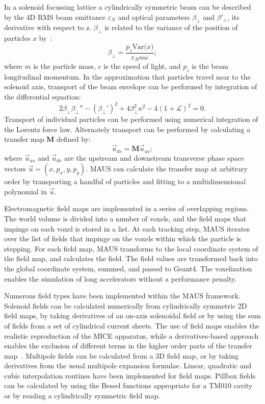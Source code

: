 \documentclass[11pt,a4paper]{article}
\begin{document}
In a solenoid focussing lattice a cylindrically symmetric beam can be described by the 4D RMS beam emittance $\varepsilon_N$ and optical parameters $\beta_\perp$ and $\beta'_\perp$, its derivative with respect to z. $\beta_\perp$ is related to the variance of the position of particles $x$ by~\cite{PennEnvelope}:
\begin{equation}
\beta_\perp = \frac{p_{z}\mathrm{Var(}x\mathrm{)}}{\varepsilon_N mc};
\end{equation}
where $m$ is the particle mass, $c$ is the speed of light, and $p_z$ is the beam longitudinal momentum. In the approximation that particles travel near to the solenoid axis, transport of the beam envelope can be performed by integration of the differential equation:
\begin{equation}
2\beta_\perp \beta_\perp'' - (\beta_\perp')^2 + 4 \beta_\perp^2 \kappa^2 - 4 (1+\mathcal{L})^2 = 0.
\end{equation}
Transport of individual particles can be performed using numerical integration of the Lorentz force law. Alternately transport can be performed by calculating a transfer map $\mathbf{M}$ defined by:
\begin{equation}
\vec{u}_{ds} = \mathbf{M} \vec{u}_{us};
\end{equation}
where $\vec{u}_{us}$ and $\vec{u}_{ds}$ are the upstream and downstream transverse phase space vectors $\vec{u} = (x, p_x, y, p_y)$. MAUS can calculate the transfer map at arbitrary order by transporting a handful of particles and fitting to a multidimensional polynomial in $\vec{u}$.

Electromagnetic field maps are implemented in a series of overlapping regions. The world volume is divided into a number of voxels, and the field maps that impinge on each voxel is stored in a list. At each tracking step, MAUS iterates over the list of fields that impinge on the voxels within which the particle is stepping. For each field map, MAUS transforms to the local coordinate system of the field map, and calculates the field. The field values are transformed back into the global coordinate system, summed, and passed to Geant4. The voxelization enables the simulation of long accelerators without a performance penalty.

Numerous field types have been implemented within the MAUS framework. Solenoid fields can be calculated numerically from cylindrically symmetric 2D field maps, by taking derivatives of an on-axis solenoidal field or by using the sum of fields from a set of cylindrical current sheets. The use of field maps enables the realistic reproduction of the MICE apparatus, while a derivatives-based approach enables the exclusion of different terms in the higher order parts of the transfer map~\cite{NonlinearNote}. Multipole fields can be calculated from a 3D field map, or by taking derivatives from the usual multipole expansion formulae. Linear, quadratic and cubic interpolation routines have been implemented for field maps. Pillbox fields can be calculated by using the Bessel functions appropriate for a TM010 cavity or by reading a cylindrically symmetric field map.
\end{document}
